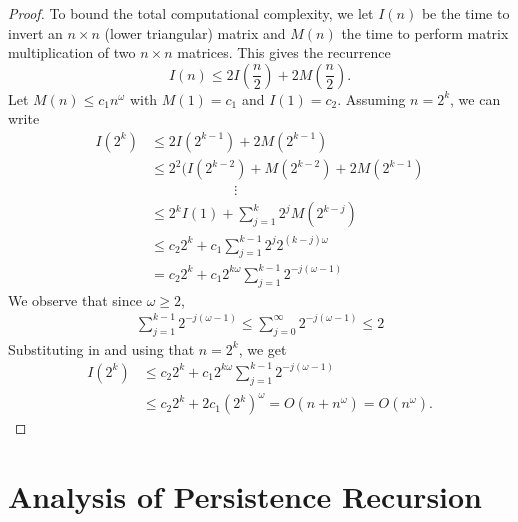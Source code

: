 \documentclass{article}
\newcommand{\matsize}[2]{#1\times #2}
\newcommand{\matexp}{\omega}
\begin{document}
\begin{proof}
To bound the total computational complexity, we let $I(n)$ be the time to invert an $\matsize{n}{n}$ (lower triangular) matrix and $M(n)$ the time to perform matrix multiplication of two $\matsize{n}{n}$ matrices. This gives the recurrence
 \[I(n) \leq 2 I\left(\frac{n}{2}\right) + 2 M\left(\frac{n}{2}\right).\]
Let  $M(n) \leq c_1 n^{\matexp}$ with $M(1)=c_1$ and $I(1)=c_2$. Assuming $n = 2^{k}$, we can write 
\begin{align*}
 I(2^k) &\leq  2I(2^{k-1}) +2M(2^{k-1})\\
 &\leq  2^2 (I(2^{k-2})+M(2^{k-2}) +2M(2^{k-1})\\
 &\qquad\qquad\qquad\vdots\\
 &\leq  2^k I(1) + \sum\limits_{j=1}^{k}2^jM(2^{k-j})\\
 &\leq  c_2 2^k  + c_1 \sum\limits_{j=1}^{k-1}2^j 2^{(k-j)\matexp}\\
 &=  c_2 2^k  + c_1 2^{k\matexp} \sum\limits_{j=1}^{k-1}2^{-j(\matexp-1)}
 \end{align*}
 We observe that since $\matexp \geq 2$,
 \begin{align*}
 \sum\limits_{j=1}^{k-1}2^{-j(\matexp-1)} \leq  \sum\limits_{j=0}^{\infty}2^{-j(\matexp-1)}  \leq 2
 \end{align*}
 Substituting in and  using that $n=2^k$, we get
 \begin{align*}
 I(2^k) &\leq  c_2 2^k  + c_1 2^{k\matexp} \sum\limits_{j=1}^{k-1}2^{-j(\matexp-1)}\\
 &\leq c_2 2^k  + 2 c_1 (2^k)^\matexp = O(n+ n^\matexp) = O(n^\matexp).
 \end{align*}
 
\end{proof}

\section{Analysis of Persistence Recursion}
\label{appendix:recursion-analysis}
\end{document}
